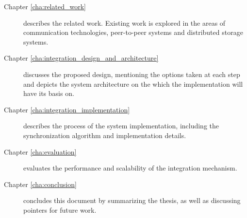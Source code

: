 \begin{description}
\item[Chapter \ref{cha:related_work}] describes the related work. Existing work is explored in the areas of communication technologies, peer-to-peer systems and distributed storage systems.

\item[Chapter \ref{cha:integration_design_and_architecture}] discusses the proposed design, mentioning the options taken at each step and depicts the system architecture on the which the implementation will have its basis on.

\item[Chapter \ref{cha:integration_implementation}] describes the process of the system implementation, including the synchronization algorithm and implementation details.

\item[Chapter \ref{cha:evaluation}] evaluates the performance and scalability of the integration mechanism.

\item[Chapter \ref{cha:conclusion}] concludes this document by summarizing the thesis, as well as discussing pointers for future work.
\end{description}